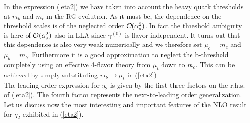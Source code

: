 In the expression (\ref{eta2}) we have taken into account the heavy
quark thresholds at $m_b$ and $m_c$ in the RG evolution. As it must
be, the dependence on the threshold scales is of the neglected
order ${\cal O}(\alpha^2_s)$. In fact the threshold ambiguity is here of
${\cal O}(\alpha_{\rm s}^2)$ also in LLA since $\gamma^{(0)}$ is flavor independent.
It turns out that this dependence is also very weak numerically and
we therefore set $\mu_c=m_c$ and $\mu_b=m_b$. Furthermore it is
a good approximation to neglect the b-threshold completely
using an effective 4-flavor theory from $\mu_t$ down to $m_c$. This
can be achieved by simply substituting $m_b\to\mu_t$ in (\ref{eta2}).
\\
The leading order expression for $\eta_2$ is given by the first three
factors on the r.h.s. of (\ref{eta2}). The fourth factor represents
the next-to-leading order generalization. Let us discuss now the
most interesting and important features of the NLO result for $\eta_2$
exhibited in (\ref{eta2}).
